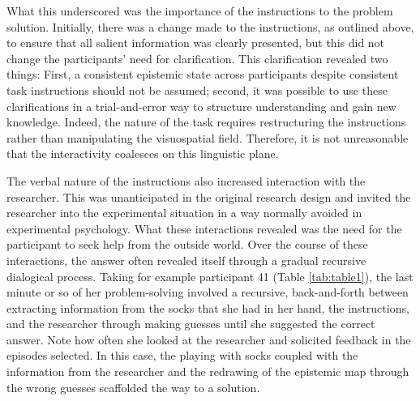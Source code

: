 \documentclass[twocolumn, issue, empirical, authordate,drafn]{jote-new-article}
\begin{document}
What this underscored was the importance of the instructions to the problem solution. Initially, there was a change made to the instructions, as outlined above, to ensure that all salient information was clearly presented, but this did not change the participants' need for clarification. This clarification revealed two things: First, a consistent epistemic state across participants despite consistent task instructions should not be assumed; second, it was possible to use these clarifications in a trial-and-error way to structure understanding and gain new knowledge. Indeed, the nature of the task requires restructuring the instructions rather than manipulating the visuospatial field. Therefore, it is not unreasonable that the interactivity coalesces on this linguistic plane. 

The verbal nature of the instructions also increased interaction with the researcher. This was unanticipated in the original research design and invited the researcher into the experimental situation in a way normally avoided in experimental psychology. What these interactions revealed was the need for the participant to seek help from the outside world. Over the course of these interactions, the answer often revealed itself through a gradual recursive dialogical process. Taking for example participant 41 (Table \ref{tab:table1}), the last minute or so of her problem-solving involved a recursive, back-and-forth between extracting information from the socks that she had in her hand, the instructions, and the researcher through making guesses until she suggested the correct answer. Note how often she looked at the researcher and solicited feedback in the episodes selected. In this case, the playing with socks coupled with the information from the researcher and the redrawing of the epistemic map through the wrong guesses scaffolded the way to a solution. 
\end{document}
